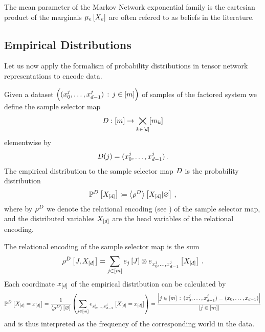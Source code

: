 The mean parameter of the Markov Network exponential family is the cartesian product of the marginals $\mu_{e}\left[X_{e}\right]$ are often refered to as beliefs in the literature.

\subsection{Empirical Distributions}\label{sec:empDistribution}

Let us now apply the formalism of probability distributions in tensor network representations to encode data.
\begin{definition}\label{def:dataMap}
	Given a dataset $\left(({x_{0}^{j},\ldots,x_{d-1}^{j}})\,:\,j\in[m]\right)$ of samples of the factored system we define the sample selector map
		\[ D : [m] \rightarrow \bigtimes_{k\in[d]}[m_{k}] \]
	elementwise by 
		\[ D(j) = ({x_{0}^{j},\ldots,x_{d-1}^{j}}) \, . \]
	The empirical distribution to the sample selector map $D$ is the probability distribution
	\begin{align*}
		\mathbb{P}^{D}\left[X_{[d]}\right]
		\coloneqq \left\langle \rho^{D}\right\rangle \left[ X_{[d]} | \varnothing \right] \, ,
	\end{align*}
	where by $\rho^{D}$ we denote the relational encoding (see ) of the sample selector map, and the distributed variables $X_{[d]}$ are the head variables of the relational encoding.
\end{definition}

The relational encoding of the sample selector map is the sum 
	\[ \rho^{D}\left[J,X_{[d]}\right] 
	= \sum_{j\in[m]} e_{j}\left[J\right] \otimes e_{{x_{0}^{j},\ldots,x_{d-1}^{j}}}\left[X_{[d]}\right] \, . \]
Each coordinate $x_{[d]}$ of the empirical distribution can be calculated by
\begin{align*}
	\mathbb{P}^{D}\left[X_{[d]}=x_{[d]}\right] 
	= \frac{1}{\left\langle \rho^{D}\right\rangle \left[ \varnothing \right]} \left( \sum_{j\in[m]} e_{{x_{0}^{j},\ldots,x_{d-1}^{j}}}\left[X_{[d]}=x_{[d]}\right]  \right) 
	= \frac{\left|j\in[m] \, : \, ({x_{0}^{j},\ldots,x_{d-1}^{j}}) = (x_{0},\ldots,x_{d-1})\right|}{\left|j\in[m]\right|}
\end{align*}
and is thus interpreted as the frequency of the corresponding world in the data.

